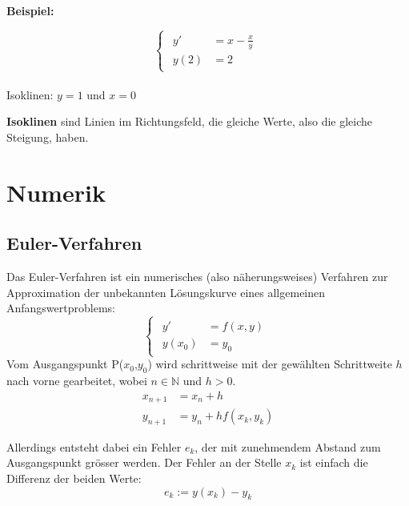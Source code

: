 \documentclass[10pt,a4paper]{article}
\begin{document}
\begin{mdframed}
  \textbf{Beispiel:}
  
  \begin{equation*}
    \begin{cases}
     \begin{aligned}
        y' &= x - \frac{x}{y}\\ 
        y(2) &= 2
      \end{aligned}
  \end{cases}
\end{equation*}
\\
\indent Isoklinen: $y = 1$ und $x = 0$
\end{mdframed}

\begin{Definitionsbox}
  \textbf{Isoklinen} sind Linien im Richtungsfeld, die gleiche Werte, also die gleiche Steigung, haben.
\end{Definitionsbox}

\newpage
\section{Numerik}
\subsection{Euler-Verfahren}
Das Euler-Verfahren ist ein numerisches (also näherungsweises) Verfahren zur Approximation der unbekannten Lösungskurve eines allgemeinen Anfangswertproblems:
\begin{equation*}
  \begin{cases}
    \begin{aligned}
      y' &= f(x,y)\\ 
      y(x_0) &= y_0
    \end{aligned}
  \end{cases}
\end{equation*}
Vom Ausgangspunkt P($x_0$,$y_0$) wird schrittweise mit der gewählten Schrittweite $h$ nach vorne gearbeitet, wobei $n \in \mathbb{N}$ und $h >0$.
\begin{align*}
  x_{n+1} &= x_n + h\\
  y_{n+1} &= y_n + hf(x_k,y_k)
\end{align*}

Allerdings entsteht dabei ein Fehler $e_k$, der mit zunehmendem Abstand zum Ausgangspunkt grösser werden. Der Fehler an der Stelle $x_k$ ist einfach die Differenz der beiden Werte:
\begin{equation*}
  e_k := y(x_k) - y_k
\end{equation*}
\end{document}
